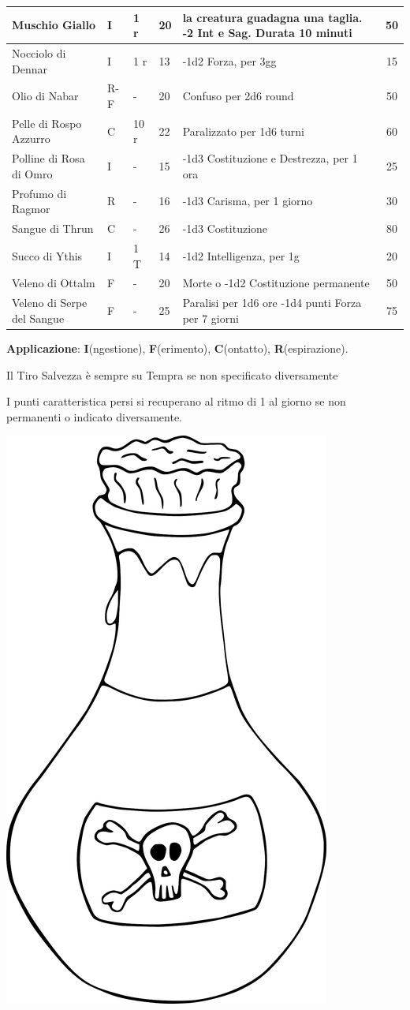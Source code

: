 \begin{tabularx}{1\textwidth}{m{4.8cm}lllm{6.5cm}c}
	\midrule
	Muschio Giallo \index{Muschio Giallo}& I& 1 r& 20& la creatura guadagna una taglia. -2 Int e Sag. Durata 10 minuti& 50\\
	\midrule
	Nocciolo di Dennar \index{Nocciolo di Dennar}& I& 1 r& 13& -1d2 Forza, per 3gg& 15\\
	\midrule
	Olio di Nabar \index{Olio di Nabar}& R-F& - & 20& Confuso per 2d6 round& 50\\
	\midrule
	Pelle di Rospo Azzurro \index{Pelle di Rospo Azzurro}& C& 10 r & 22& Paralizzato per 1d6 turni& 60\\
	\midrule
	Polline di Rosa di Omro\index{Polline di Rosa di Omro} & I& - & 15& -1d3 Costituzione e Destrezza, per 1 ora & 25\\
	\midrule
	Profumo di Ragmor \index{Profumo di Ragmor}& R& - & 16& -1d3 Carisma, per 1 giorno & 30\\
	\midrule
	Sangue di Thrun \index{Sangue di Thrun} & C& - & 26& -1d3 Costituzione & 80\\
	\midrule
	Succo di Ythis\index{Succo di Ythis} & I& 1 T& 14& -1d2 Intelligenza, per 1g& 20\\
	\midrule
	Veleno di Ottalm\index{Veleno di Ottalm}& F& - & 20& Morte o -1d2 Costituzione permanente& 50\\
	\midrule
	Veleno di Serpe del Sangue \index{Veleno di Serpe del Sangue} & F& - & 25& Paralisi per 1d6 ore -1d4 punti Forza per 7 giorni & 75\\
	\bottomrule
\end{tabularx}

\medskip

\textbf{Applicazione}: \textbf{I}(ngestione), \textbf{F}(erimento), \textbf{C}(ontatto), \textbf{R}(espirazione).

Il Tiro Salvezza è sempre su Tempra se non specificato diversamente

I punti caratteristica persi si recuperano al ritmo di 1 al giorno se non permanenti o indicato diversamente.

\vfill

\begin{center}
\includegraphics[height=0.3\linewidth]{immagini/poison.png}
\end{center}



